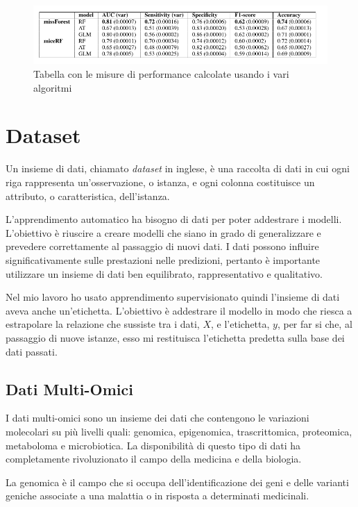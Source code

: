 \documentclass[12pt,italian]{report}
\begin{document}
	\begin{figure}[h]
		\centering
		\includegraphics[width=0.8\linewidth]{immagini/resultCovidModel}
		\caption{Tabella con le misure di performance calcolate usando i vari algoritmi}
		\label{fig:resultcovidmodel}
	\end{figure}
	
	
	\chapter{Dataset}
	Un insieme di dati, chiamato \textit{dataset} in inglese, è una raccolta di dati in cui ogni riga rappresenta un'osservazione, o istanza, e ogni colonna costituisce un attributo, o caratteristica, dell'istanza.
	
	L'apprendimento automatico ha bisogno di dati per poter addestrare i modelli. L'obiettivo è riuscire a creare modelli che siano in grado di generalizzare e prevedere correttamente al passaggio di nuovi dati. I dati possono influire significativamente sulle prestazioni nelle predizioni, pertanto è importante utilizzare un insieme di dati ben equilibrato, rappresentativo e qualitativo.

	Nel mio lavoro ho usato apprendimento supervisionato quindi l'insieme di dati aveva anche un'etichetta. L'obiettivo è addestrare il modello in modo che riesca a estrapolare la relazione che sussiste tra i dati, $X$, e l'etichetta, $y$, per far si che, al passaggio di nuove istanze, esso mi restituisca l'etichetta predetta sulla base dei dati passati.
	
	\section{Dati Multi-Omici}
	I dati multi-omici sono un insieme dei dati che contengono le variazioni molecolari su più livelli quali: genomica, epigenomica, trascrittomica, proteomica, metaboloma e microbiotica. La disponibilità di questo tipo di dati ha completamente rivoluzionato il campo della medicina e della biologia.
	
	La genomica è il campo che si occupa dell'identificazione dei geni e delle varianti geniche associate a una malattia o in risposta a determinati medicinali. 
	
\end{document}
